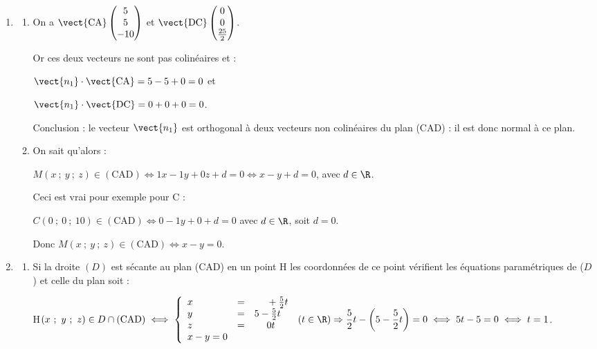 \medskip

\begin{enumerate}
\item
	\begin{enumerate}
		\item On a $\vect{\text{CA}}\begin{pmatrix}5\\5\\-10\end{pmatrix}$ et $\vect{\text{DC}}\begin{pmatrix}0\\0\\\frac{25}{2}\end{pmatrix}$.
		
Or ces deux vecteurs ne sont pas colinéaires et :

$\vect{n_1} \cdot \vect{\text{CA}} = 5 - 5 + 0 = 0$ et 

$\vect{n_1} \cdot \vect{\text{DC}} = 0 +  0 + 0 = 0$.

Conclusion : le vecteur $\vect{n_1}$ est orthogonal à deux vecteurs non colinéaires du plan (CAD) : il est donc normal à ce plan.
		\item On sait qu'alors :
		
$M(x~;~y~;~z) \in (\text{CAD}) \iff 1x - 1y + 0z + d = 0 \iff x - y + d = 0$, avec \:$ d \in \R$.

Ceci est vrai pour exemple pour C :

$C(0~;~0~;~10) \in (\text{CAD}) \iff 0 - 1y + 0 + d = 0$  avec \: $d \in \R$, soit $d = 0$.

Donc $M(x~;~y~;~z) \in (\text{CAD}) \iff x - y  = 0$.
	\end{enumerate}
\item
	\begin{enumerate}
		\item Si la droite $(D)$ est sécante au plan (CAD) en un point H les coordonnées de ce point vérifient les équations paramétriques de ($D$) et celle du plan soit :

H$(x~;~y~;~z) \in D \cap (\text{CAD})\iff \left\{\begin{array}{l c l}
x&=&\phantom{5 -} + \frac52 t\\
y &=&5 - \frac52 t\\
z&=&\phantom{5 -}0t\\
x - y = 0
\end{array}\right.\:(t \in \R) \Rightarrow \dfrac52t - \left(5 - \dfrac52 t \right) = 0 \iff 5t - 5 = 0 \iff t = 1$.


\end{enumerate}
\end{enumerate}
